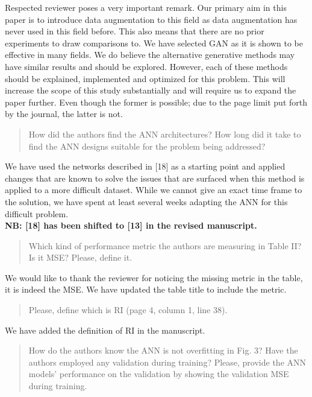 \documentclass{article}
\begin{document}
	Respected reviewer poses a very important remark. Our primary aim in this paper is to introduce data augmentation to this field as data augmentation has never used in this field before. This also means that there are no prior experiments to draw comparisons to. We have selected GAN as it is shown to be effective in many fields. We do believe the alternative generative methods may have similar results and should be explored. However, each of these methods should be explained, implemented and optimized for this problem. This will increase the scope of this study substantially and will require us to expand the paper further. Even though the former is possible; due to the page limit put forth by the journal, the latter is not. 
	
	\begin{quote}
	How did the authors find the ANN architectures? How long did it take to find the ANN designs suitable for the problem being addressed?
	\end{quote}
	
	We have used the networks described in [18] as a starting point and applied changes that are known to solve the issues that are surfaced when this method is applied to a more difficult dataset. While we cannot give an exact time frame to the solution, we have spent at least several weeks adapting the ANN for this difficult problem. \\
	
	\textbf{NB: [18] has been shifted to [13] in the revised manuscript.}
	
	\begin{quote}
	Which kind of performance metric the authors are measuring in Table II? Is it MSE? Please, define it.
	\end{quote}
	
	We would like to thank the reviewer for noticing the missing metric in the table, it is indeed the MSE. We have updated the table title to include the metric.
	
	\begin{quote}
	Please, define which is RI (page 4, column 1, line 38).
	\end{quote}
	
	We have added the definition of RI in the manuscript.
	
	\begin{quote}
	How do the authors know the ANN is not overfitting in Fig. 3? Have the authors employed any validation during training? Please, provide the ANN models' performance on the validation by showing the validation MSE during training.
	\end{quote}
	
\end{document}

